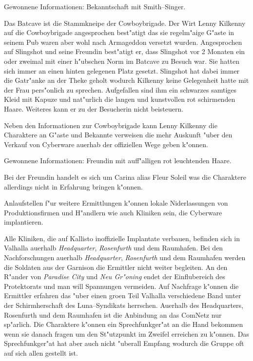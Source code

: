 \begin{remarks}
	Gewonnene Informationen: Bekanntschaft mit Smith--Singer.	
\end{remarks}


Das Batcave ist die Stammkneipe der Cowboybrigade. Der Wirt Lenny Kilkenny auf die Cowboybrigade angesprochen best"atigt das sie regelm"a\3ige G"aste in seinem Pub waren aber wohl nach Armageddon versetzt wurden. Angesprochen auf Slingshot und seine Freundin best"atigt er, dass Slingshot vor 2 Monaten ein oder zweimal mit einer h"ubschen Norm im Batcave zu Besuch war. Sie hatten sich immer an einen hinten gelegenen Platz gesetzt. Slingshot hat dabei immer die Gatr"anke an der Theke geholt wodurch Kilkenny keine Gelegenheit hatte mit der Frau pers"onlich zu sprechen. Aufgefallen sind ihm ein schwarzes samtiges Kleid mit Kapuze und nat"urlich die langen und kunstvollen rot schirmenden Haare. Weiteres kann er zu der Besucherin nicht beisteuern.

Neben den Informationen zur Cowboybrigade kann Lenny Kilkenny die Charaktere an G"aste und Bekannte verweisen die mehr Auskunft "uber den Verkauf von Cyberware au\3erhab der offiziellen Wege geben k"onnen.

\begin{remarks}
	Gewonnene Informationen: Freundin mit auff"alligen rot leuchtenden Haare. 
	
	Bei der Freundin handelt es sich um Carina alias Fleur Soleil was die Charaktere allerdings nicht in Erfahrung bringen k"onnen.
\end{remarks}	


Anlaufstellen f"ur weitere Ermittlungen k"onnen lokale Niderlassungen von Produktionsfirmen und H"andlern wie auch Kliniken sein, die Cyberware implantieren.

Alle Kliniken, die auf Kallisto inoffizielle Implantate verbauen, befinden sich in Valhalla au\3erhalb \emph{Headquarter}, \emph{Rosenfurth} und dem Raumhafen. Bei den Nachforschungen au\3erhalb \emph{Headquarter}, \emph{Rosenfurth} und dem Raumhafen werden die Soldaten aus der Garnison die Ermittler nicht weiter begleiten. An den R"ander von \emph{Paradise City} und \emph{Neu Gr"oning} endet der Einflu\3bereich des Protektorats und man will Spannungen vermeiden. Auf Nachfrage k"onnen die Ermittler erfahren das "uber einen gro\3en Teil Valhalla verschiedene Band unter der Schirmherschaft des Luna--Syndikats herrschen. Au\3erhalb des Headquarters, Rosenfurth und dem Raumhafen ist die Anbindung an das ComNetz nur sp"arlich. Die Charaktere k"onnen ein Sprechfunkger"at an die Hand bekommen wenn sie danach fragen um den St"utzpunkt im Zweifel erreichen zu k"onnen. Das Sprechfunkger"at hat aber auch nicht "uberall Empfang wodurch die Gruppe oft auf sich allen gestellt ist.

